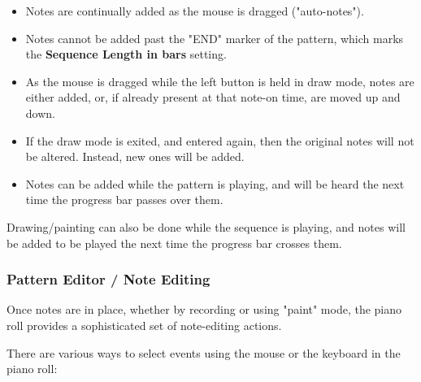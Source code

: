    \begin{itemize}
      \item Notes are continually added as the mouse is dragged ("auto-notes").
      \item Notes cannot be added past the "END" marker of the pattern, which
         marks the \textbf{Sequence Length in bars} setting.
      \item As the mouse is dragged while the left button is held in draw mode,
         notes are either added, or, if already present at that note-on time,
         are moved up and down.
      \item If the draw mode is exited, and entered again, then the original
         notes will not be altered.  Instead, new ones will be added.
      \item Notes can be added while the pattern is playing, and will be heard
         the next time the progress bar passes over them.
   \end{itemize}

   Drawing/painting can also be done while the sequence is playing,
   and notes will be added to be played the next time the progress bar crosses
   them.

\subsubsection{Pattern Editor / Note Editing}
\label{subsubsec:pattern_editor_note_editing}

   Once notes are in place, whether by recording or using "paint" mode,
   the piano roll provides a sophisticated set of note-editing
   actions.

   \setcounter{ItemCounter}{0}      %

   There are various ways to select events using
   the mouse or the keyboard in the piano roll:

